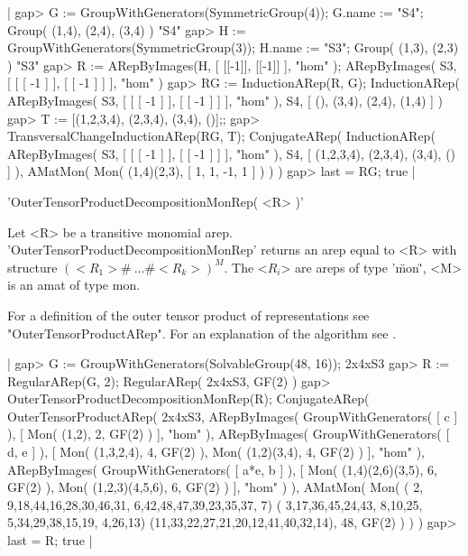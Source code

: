 |    gap> G := GroupWithGenerators(SymmetricGroup(4)); G.name := "S4";
    Group( (1,4), (2,4), (3,4) )
    "S4"
    gap> H := GroupWithGenerators(SymmetricGroup(3)); H.name := "S3";
    Group( (1,3), (2,3) )
    "S3"
    gap> R := ARepByImages(H, [ [[-1]], [[-1]] ], "hom" );
    ARepByImages(
      S3,
      [ [ [ -1 ] ], [ [ -1 ] ] ],
      "hom"
    )
    gap> RG := InductionARep(R, G);
    InductionARep(
      ARepByImages(
        S3,
        [ [ [ -1 ] ], [ [ -1 ] ] ],
        "hom"
      ),
      S4,
      [ (), (3,4), (2,4), (1,4) ]
    )
    gap> T := [(1,2,3,4), (2,3,4), (3,4), ()];;
    gap> TransversalChangeInductionARep(RG, T);     
    ConjugateARep(
      InductionARep(
        ARepByImages(
          S3,
          [ [ [ -1 ] ], [ [ -1 ] ] ],
          "hom"
        ),
        S4,
        [ (1,2,3,4), (2,3,4), (3,4), () ]
      ),
      AMatMon( Mon( (1,4)(2,3), [ 1, 1, -1, 1 ] ) )
    )
    gap> last = RG;
    true |


'OuterTensorProductDecompositionMonRep( <R> )'

Let <R> be a transitive monomial arep. 
'OuterTensorProductDecompositionMonRep' returns an arep 
equal to <R> with structure $(<R_1>\#\ \dots\#<R_k>)^M.$
The <$R_i$> are areps 
of type '\"mon\"', <M> is an amat of type mon.

For a definition of the outer tensor product of representations
see "OuterTensorProductARep".
For an explanation of the algorithm see \cite{Pue99}.

|    gap> G := GroupWithGenerators(SolvableGroup(48, 16));
    2x4xS3
    gap> R := RegularARep(G, 2);
    RegularARep( 2x4xS3, GF(2) )
    gap> OuterTensorProductDecompositionMonRep(R);
    ConjugateARep(
      OuterTensorProductARep(
        2x4xS3,
        ARepByImages(
          GroupWithGenerators( [ c ] ),
          [ Mon( (1,2), 2, GF(2) ) ],
          "hom"
        ),
        ARepByImages(
          GroupWithGenerators( [ d, e ] ),
          [ Mon( (1,3,2,4), 4, GF(2) ),
            Mon( (1,2)(3,4), 4, GF(2) )
          ],
          "hom"
        ),
        ARepByImages(
          GroupWithGenerators( [ a*e, b ] ),
          [ Mon( (1,4)(2,6)(3,5), 6, GF(2) ),
            Mon( (1,2,3)(4,5,6), 6, GF(2) )
          ],
          "hom"
        )
      ),
      AMatMon( Mon( ( 2, 9,18,44,16,28,30,46,31, 6,42,48,47,39,23,35,37, 7)
    ( 3,17,36,45,24,43, 8,10,25, 5,34,29,38,15,19, 4,26,13)
    (11,33,22,27,21,20,12,41,40,32,14), 48, GF(2) ) )
    )
    gap> last = R;
    true |

